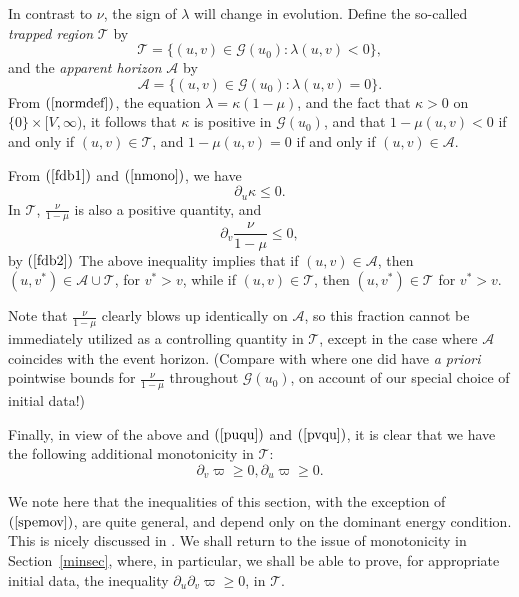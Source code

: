 \documentclass{article}
\begin{document}
In contrast to $\nu$, the sign of
$\lambda$ will change in evolution.
Define the so-called
\emph{trapped region} $\mathcal{T}$ by
\[
\mathcal{T}=\{(u,v)\in\mathcal{G}(u_0):\lambda(u,v)<0\},
\]
and the \emph{apparent horizon} $\mathcal{A}$ by
\[
\mathcal{A}=\{(u,v)\in\mathcal{G}(u_0):\lambda(u,v)=0\}.
\]
From $(\ref{normdef})$, the equation $\lambda=\kappa(1-\mu)$,
and the fact that $\kappa>0$ on $\{0\}\times[V,\infty)$,
it follows that $\kappa$ is positive in $\mathcal{G}(u_0)$, and 
 that $1-\mu(u,v)<0$ if and only if $(u,v)\in\mathcal{T}$,
and $1-\mu(u,v)=0$ if and only if $(u,v)\in\mathcal{A}$. 

From $(\ref{fdb1})$ and $(\ref{nmono})$, we have
\begin{equation}
\label{F1}
\partial_u\kappa\le0.
\end{equation}
In $\mathcal{T}$, $\frac{\nu}{1-\mu}$ is also a positive
quantity, and 
\begin{equation}
\label{F2}
\partial_v\frac\nu{1-\mu}\le0,
\end{equation}
by $(\ref{fdb2})$
The above inequality implies that
if $(u,v)\in\mathcal{A}$, then $(u,v^*)\in\mathcal{A}\cup\mathcal{T}$,
for $v^*>v$, while if $(u,v)\in\mathcal{T}$, then
$(u,v^*)\in\mathcal{T}$ for $v^*>v$.

Note that $\frac{\nu}{1-\mu}$ clearly blows up 
identically on $\mathcal{A}$,
so this fraction cannot be immediately utilized as a controlling 
quantity in $\mathcal{T}$, except in the case
where $\mathcal{A}$ coincides with the event horizon.
(Compare with \cite{md:si} where one did have \emph{a priori} pointwise
bounds for $\frac{\nu}{1-\mu}$ throughout $\mathcal{G}(u_0)$, on account
of our special choice of initial data!)

Finally, in view of the above
and $(\ref{puqu})$ and $(\ref{pvqu})$, it is clear
that we have the following
additional monotonicity in $\mathcal{T}$:
\begin{equation}
\label{spemov}
\partial_v\varpi\ge0, \partial_u\varpi\ge0.
\end{equation}

We note here that the inequalities of this section,
with the exception of $(\ref{spemov})$, are quite general, and
depend only on the dominant energy condition.   This is nicely discussed
in \cite{chr:sgrf}. 
We shall return to the issue of monotonicity in Section~\ref{minsec},
where, in particular, we shall be able to prove, for appropriate initial
data, the inequality $\partial_u\partial_v\varpi\ge0$, in $\mathcal{T}$. 
\end{document}
